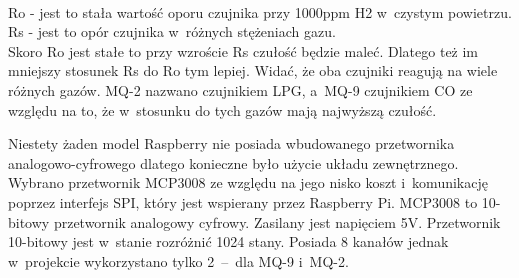 \\Ro - jest to stała wartość oporu czujnika przy 1000ppm H2 w~czystym powietrzu.\\
Rs - jest to opór czujnika w~różnych stężeniach gazu. \\
Skoro Ro jest stałe to przy wzroście Rs czułość będzie maleć. Dlatego też im mniejszy stosunek Rs do Ro tym lepiej. Widać, że oba czujniki reagują na wiele różnych gazów. MQ-2 nazwano czujnikiem LPG, a~MQ-9 czujnikiem CO ze względu na to, że w~stosunku do tych gazów mają najwyższą czułość. 

Niestety żaden model Raspberry nie posiada wbudowanego przetwornika analogowo-cyfrowego dlatego konieczne było użycie układu zewnętrznego. Wybrano przetwornik MCP3008 ze względu na jego nisko koszt i~komunikację poprzez interfejs SPI, który jest wspierany przez Raspberry Pi. MCP3008 to 10-bitowy przetwornik analogowy cyfrowy. Zasilany jest napięciem 5V.  Przetwornik 10-bitowy jest w~stanie rozróżnić 1024 stany. Posiada 8 kanałów jednak w~projekcie wykorzystano tylko 2~–~dla MQ-9 i~MQ-2.
